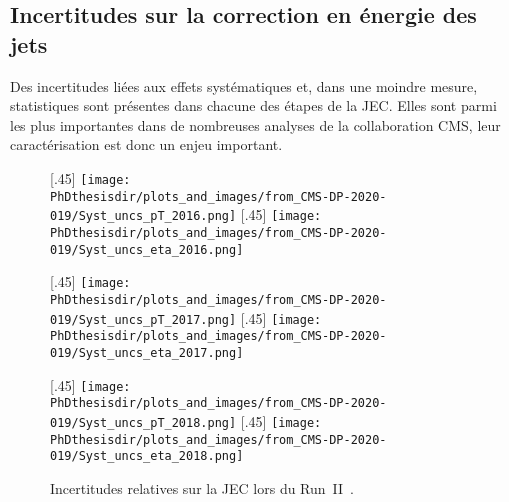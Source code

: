 \subsection{Incertitudes sur la correction en énergie des jets}\label{chapter-JERC-section-CMS-subsec-unc}
Des incertitudes liées aux effets systématiques et, dans une moindre mesure, statistiques sont présentes dans chacune des étapes de la JEC.
Elles sont parmi les plus importantes dans de nombreuses analyses de la collaboration CMS, leur caractérisation est donc un enjeu important.
\begin{figure}[p]
\centering
{}[.45\textwidth]
{\texttt{[image: \\PhDthesisdir/plots\_and\_images/from\_CMS-DP-2020-019/Syst\_uncs\_pT\_2016.png]}\vspace{-.5\baselineskip}}
\hfill
{}[.45\textwidth]
{\texttt{[image: \\PhDthesisdir/plots\_and\_images/from\_CMS-DP-2020-019/Syst\_uncs\_eta\_2016.png]}\vspace{-.5\baselineskip}}

\vspace{.75\baselineskip}

[.45\textwidth]
{\texttt{[image: \\PhDthesisdir/plots\_and\_images/from\_CMS-DP-2020-019/Syst\_uncs\_pT\_2017.png]}\vspace{-.5\baselineskip}}
\hfill
{}[.45\textwidth]
{\texttt{[image: \\PhDthesisdir/plots\_and\_images/from\_CMS-DP-2020-019/Syst\_uncs\_eta\_2017.png]}\vspace{-.5\baselineskip}}

\vspace{.75\baselineskip}

[.45\textwidth]
{\texttt{[image: \\PhDthesisdir/plots\_and\_images/from\_CMS-DP-2020-019/Syst\_uncs\_pT\_2018.png]}\vspace{-.5\baselineskip}}
\hfill
{}[.45\textwidth]
{\texttt{[image: \\PhDthesisdir/plots\_and\_images/from\_CMS-DP-2020-019/Syst\_uncs\_eta\_2018.png]}\vspace{-.5\baselineskip}}

\caption[Incertitudes relatives sur la JEC en fonction de \pT\ et $\eta$ lors du Run~II.]{Incertitudes relatives sur la JEC lors du Run~II~\cite{CMS-DP-2020-019}.}
\label{fig-Syst_uncs_JEC_RunII}
\end{figure}
